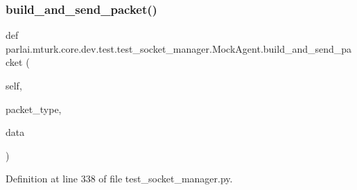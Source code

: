 \subsubsection{\texorpdfstring{build\+\_\+and\+\_\+send\+\_\+packet()}{build\_and\_send\_packet()}}
{\footnotesize\ttfamily def parlai.\+mturk.\+core.\+dev.\+test.\+test\+\_\+socket\+\_\+manager.\+Mock\+Agent.\+build\+\_\+and\+\_\+send\+\_\+packet (\begin{DoxyParamCaption}\item[{}]{self,  }\item[{}]{packet\+\_\+type,  }\item[{}]{data }\end{DoxyParamCaption})}



Definition at line 338 of file test\+\_\+socket\+\_\+manager.\+py.



